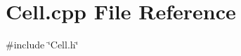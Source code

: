 \section{Cell.\+cpp File Reference}
\label{Cell_8cpp}
{\ttfamily \#include \char`\"{}Cell.\+h\char`\"{}}\newline
